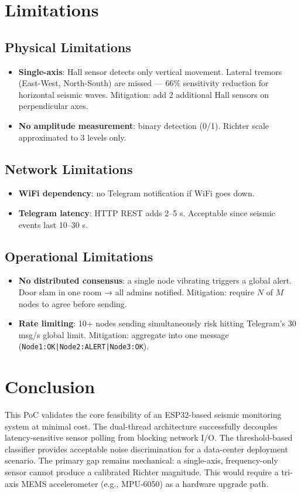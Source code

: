 \documentclass[11pt,a4paper]{article}
\begin{document}
\section{Limitations}

\subsection{Physical Limitations}
\begin{itemize}[noitemsep]
  \item \textbf{Single-axis}: Hall sensor detects only vertical movement. Lateral tremors (East-West, North-South) are missed — 66\% sensitivity reduction for horizontal seismic waves. Mitigation: add 2 additional Hall sensors on perpendicular axes.
  \item \textbf{No amplitude measurement}: binary detection (0/1). Richter scale approximated to 3 levels only.
\end{itemize}

\subsection{Network Limitations}
\begin{itemize}[noitemsep]
  \item \textbf{WiFi dependency}: no Telegram notification if WiFi goes down.
  \item \textbf{Telegram latency}: HTTP REST adds 2--5 s. Acceptable since seismic events last 10--30 s.
\end{itemize}

\subsection{Operational Limitations}
\begin{itemize}[noitemsep]
  \item \textbf{No distributed consensus}: a single node vibrating triggers a global alert. Door slam in one room → all admins notified. Mitigation: require $N$ of $M$ nodes to agree before sending.
  \item \textbf{Rate limiting}: 10+ nodes sending simultaneously risk hitting Telegram's 30 msg/s global limit. Mitigation: aggregate into one message (\texttt{Node1:OK|Node2:ALERT|Node3:OK}).
\end{itemize}

\section{Conclusion}

This PoC validates the core feasibility of an ESP32-based seismic monitoring system at minimal cost. The dual-thread architecture successfully decouples latency-sensitive sensor polling from blocking network I/O. The threshold-based classifier provides acceptable noise discrimination for a data-center deployment scenario. The primary gap remains mechanical: a single-axis, frequency-only sensor cannot produce a calibrated Richter magnitude. This would require a tri-axis MEMS accelerometer (e.g., MPU-6050) as a hardware upgrade path.
\end{document}
